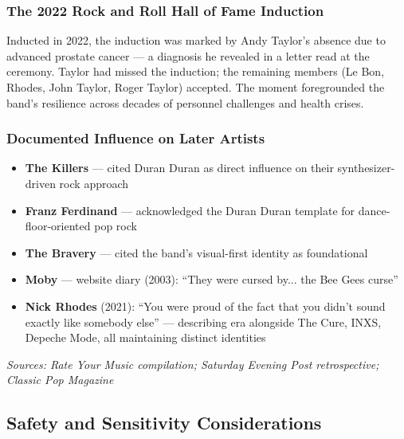 \documentclass[11pt,letterpaper]{article}
\begin{document}
\subsubsection{The 2022 Rock and Roll Hall of Fame Induction}

Inducted in 2022, the induction was marked by Andy Taylor's absence due to advanced prostate cancer --- a diagnosis he revealed in a letter read at the ceremony. Taylor had missed the induction; the remaining members (Le Bon, Rhodes, John Taylor, Roger Taylor) accepted. The moment foregrounded the band's resilience across decades of personnel challenges and health crises.

\subsubsection{Documented Influence on Later Artists}

\begin{itemize}
  \item \textbf{The Killers} --- cited Duran Duran as direct influence on their synthesizer-driven rock approach
  \item \textbf{Franz Ferdinand} --- acknowledged the Duran Duran template for dance-floor-oriented pop rock
  \item \textbf{The Bravery} --- cited the band's visual-first identity as foundational
  \item \textbf{Moby} --- website diary (2003): ``They were cursed by... the Bee Gees curse''
  \item \textbf{Nick Rhodes} (2021): ``You were proud of the fact that you didn't sound exactly like somebody else'' --- describing era alongside The Cure, INXS, Depeche Mode, all maintaining distinct identities
\end{itemize}

\textit{Sources: Rate Your Music compilation; Saturday Evening Post retrospective; Classic Pop Magazine}

\subsection{Safety and Sensitivity Considerations}
\end{document}
